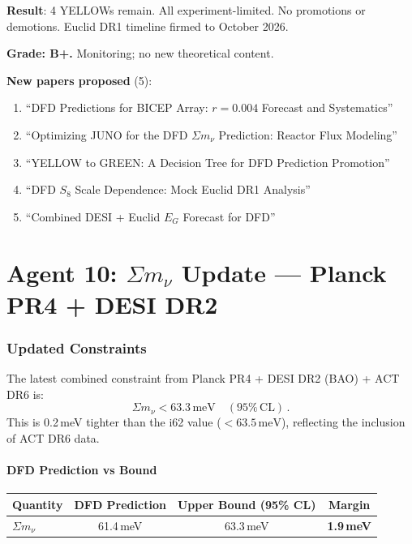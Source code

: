 \documentclass[11pt,a4paper]{article}
\begin{document}
\begin{tcolorbox}[colback=yellow!5!white, colframe=yellow!60!black, title={Agent 9: YELLOW Status Unchanged}]
\textbf{Result}: 4 YELLOWs remain. All experiment-limited. No promotions or demotions. Euclid DR1 timeline firmed to October 2026.

\textbf{Grade: B+.} Monitoring; no new theoretical content.

\textbf{New papers proposed} (5):
\begin{enumerate}
\item ``DFD Predictions for BICEP Array: $r = 0.004$ Forecast and Systematics''
\item ``Optimizing JUNO for the DFD $\Sigma m_\nu$ Prediction: Reactor Flux Modeling''
\item ``YELLOW to GREEN: A Decision Tree for DFD Prediction Promotion''
\item ``DFD $S_8$ Scale Dependence: Mock Euclid DR1 Analysis''
\item ``Combined DESI + Euclid $E_G$ Forecast for DFD''
\end{enumerate}
\end{tcolorbox}


\part{Agent 10: $\Sigma m_\nu$ Update --- Planck PR4 + DESI DR2}
\label{part:neutrino}

\section{Updated Constraints}

The latest combined constraint from Planck PR4 + DESI DR2 (BAO) + ACT DR6 is:
\begin{equation}
\Sigma m_\nu < 63.3\,\mathrm{meV} \quad (95\%\,\mathrm{CL})\,.
\end{equation}
This is 0.2\,meV tighter than the i62 value ($< 63.5\,\mathrm{meV}$), reflecting the inclusion of ACT DR6 data.

\subsection{DFD Prediction vs Bound}

\begin{center}
\begin{tabular}{lccc}
\toprule
\textbf{Quantity} & \textbf{DFD Prediction} & \textbf{Upper Bound (95\% CL)} & \textbf{Margin} \\
\midrule
$\Sigma m_\nu$ & 61.4\,meV & 63.3\,meV & \textbf{1.9\,meV} \\
\bottomrule
\end{tabular}
\end{center}
\end{document}
